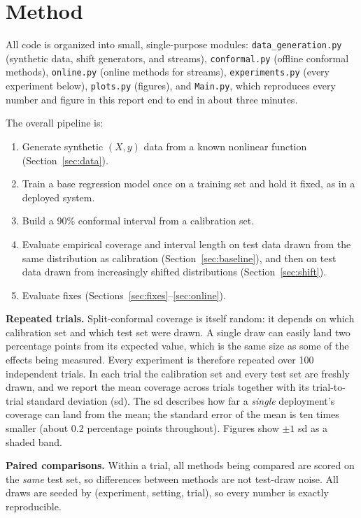 \documentclass[11pt]{article}
\begin{document}
\section{Method}

All code is organized into small, single-purpose modules:
\texttt{data\_generation.py} (synthetic data, shift generators, and streams),
\texttt{conformal.py} (offline conformal methods), \texttt{online.py} (online methods
for streams), \texttt{experiments.py} (every experiment below), \texttt{plots.py}
(figures), and \texttt{Main.py}, which reproduces every number and figure in this
report end to end in about three minutes.

The overall pipeline is:

\begin{enumerate}
  \item Generate synthetic $(X, y)$ data from a known nonlinear function
    (Section~\ref{sec:data}).
  \item Train a base regression model once on a training set and hold it fixed, as
    in a deployed system.
  \item Build a 90\% conformal interval from a calibration set.
  \item Evaluate empirical coverage and interval length on test data drawn from the
    same distribution as calibration (Section~\ref{sec:baseline}), and then on test
    data drawn from increasingly shifted distributions (Section~\ref{sec:shift}).
  \item Evaluate fixes (Sections~\ref{sec:fixes}--\ref{sec:online}).
\end{enumerate}

\textbf{Repeated trials.} Split-conformal coverage is itself random: it depends on
which calibration set and which test set were drawn. A single draw can easily land
two percentage points from its expected value, which is the same size as some of the
effects being measured. Every experiment is therefore repeated over 100 independent
trials. In each trial the calibration set and every test set are freshly drawn, and
we report the mean coverage across trials together with its trial-to-trial standard
deviation (sd). The sd describes how far a \emph{single} deployment's coverage can
land from the mean; the standard error of the mean is ten times smaller (about
0.2 percentage points throughout). Figures show $\pm 1$ sd as a shaded band.

\textbf{Paired comparisons.} Within a trial, all methods being compared are scored on
the \emph{same} test set, so differences between methods are not test-draw noise.
All draws are seeded by (experiment, setting, trial), so every number is exactly
reproducible.
\end{document}
